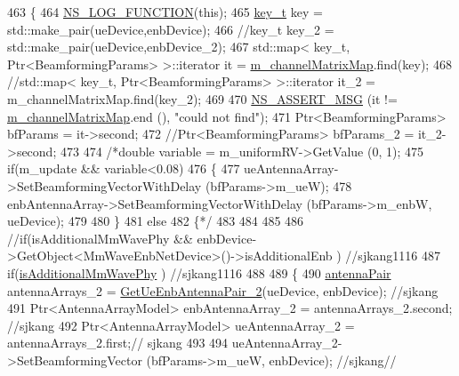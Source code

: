 \begin{DoxyCode}
463 \{
464         \hyperlink{log-macros-disabled_8h_a90b90d5bad1f39cb1b64923ea94c0761}{NS\_LOG\_FUNCTION}(\textcolor{keyword}{this});
465         \hyperlink{namespacens3_aa42bd408e172586b3b192acfaa36b070}{key\_t} key = std::make\_pair(ueDevice,enbDevice);
466         \textcolor{comment}{//key\_t key\_2 = std::make\_pair(ueDevice,enbDevice\_2);}
467         std::map< key\_t, Ptr<BeamformingParams> >::iterator it = 
      \hyperlink{classns3_1_1MmWaveBeamforming_a934e34478d7bb32f34ed64ef2e66728b}{m\_channelMatrixMap}.find(key);
468         \textcolor{comment}{//std::map< key\_t, Ptr<BeamformingParams> >::iterator it\_2 = m\_channelMatrixMap.find(key\_2);}
469 
470         \hyperlink{assert_8h_aff5ece9066c74e681e74999856f08539}{NS\_ASSERT\_MSG} (it != \hyperlink{classns3_1_1MmWaveBeamforming_a934e34478d7bb32f34ed64ef2e66728b}{m\_channelMatrixMap}.end (), \textcolor{stringliteral}{"could not find"});
471         Ptr<BeamformingParams> bfParams = it->second;
472         \textcolor{comment}{//Ptr<BeamformingParams> bfParams\_2 = it\_2->second;}
473 
474         \textcolor{comment}{/*double variable = m\_uniformRV->GetValue (0, 1);}
475 \textcolor{comment}{        if(m\_update && variable<0.08)}
476 \textcolor{comment}{        \{}
477 \textcolor{comment}{                ueAntennaArray->SetBeamformingVectorWithDelay (bfParams->m\_ueW);}
478 \textcolor{comment}{                enbAntennaArray->SetBeamformingVectorWithDelay (bfParams->m\_enbW, ueDevice);}
479 \textcolor{comment}{}
480 \textcolor{comment}{        \}}
481 \textcolor{comment}{        else}
482 \textcolor{comment}{        \{*/}
483 
484 
485 
486 \textcolor{comment}{//if(isAdditionalMmWavePhy && enbDevice->GetObject<MmWaveEnbNetDevice>()->isAdditionalEnb ) //sjkang1116}
487         \textcolor{keywordflow}{if}(\hyperlink{classns3_1_1MmWaveBeamforming_ab99a829ca6ca2545cad6551b648484bb}{isAdditionalMmWavePhy} ) \textcolor{comment}{//sjkang1116}
488 
489 \{
490         \hyperlink{namespacens3_aa7da494dc75bd8e5232a27429c48a195}{antennaPair} antennaArrays\_2 = \hyperlink{classns3_1_1MmWaveBeamforming_ab8ccc7d4fd27045fd702ee287e7098cd}{GetUeEnbAntennaPair\_2}(ueDevice, 
      enbDevice); \textcolor{comment}{//sjkang}
491                                         Ptr<AntennaArrayModel> enbAntennaArray\_2 = antennaArrays\_2.second; \textcolor{comment}{
      //sjkang}
492                                         Ptr<AntennaArrayModel> ueAntennaArray\_2 = antennaArrays\_2.first;\textcolor{comment}{//
      sjkang}
493 
494         ueAntennaArray\_2->SetBeamformingVector (bfParams->m\_ueW, enbDevice); \textcolor{comment}{//sjkang//}

\end{DoxyCode}
